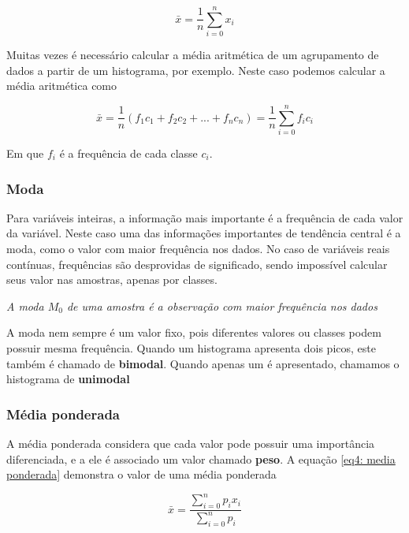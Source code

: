 \begin{equation}\label{eq3:media aritmetica}
\bar{x} = \frac{1}{n}\sum_{i = 0}^{n} x_i
\end{equation}

Muitas vezes é necessário calcular a média aritmética de um agrupamento de dados a partir de um histograma, por exemplo. Neste caso podemos calcular a média aritmética como 

\begin{equation}\label{eq3:media aritmetica}
\bar{x} = \frac{1}{n}(f_{1}c_{1} + f_{2}c_{2} + ...+ f_{n}c_{n} ) = \frac{1}{n}\sum_{i = 0}^{n} f_{i}c_{i}
\end{equation}

Em que $f_{i}$ é a frequência de cada classe $c_{i}$.

\subsubsection{Moda}

Para variáveis inteiras, a informação mais importante é a frequência de cada valor da variável. Neste caso uma das informações importantes de tendência central é a moda, como o valor com maior frequência nos dados. No caso de variáveis reais contínuas, frequências são desprovidas de significado, sendo impossível calcular seus valor nas amostras, apenas por classes.

\begin{definition}[Moda]
\textit{A moda $M_{0}$ de uma amostra é a observação com maior frequência nos dados} 
\end{definition}

A moda nem sempre é um valor fixo, pois diferentes valores ou classes podem possuir mesma frequência. Quando um histograma apresenta dois picos, este também é chamado de \textbf{bimodal}. Quando apenas um é apresentado, chamamos o histograma de \textbf{unimodal}

\subsubsection{Média ponderada}

A média ponderada considera que cada valor pode possuir uma importância diferenciada, e a ele é associado um valor chamado \textbf{peso}. A equação \eqref{eq4: media ponderada} demonstra o valor de uma média ponderada

\begin{equation}\label{eq4: media ponderada}
\bar{x} =  \frac{\sum_{i = 0}^{n} p_{i} x_{i}} {\sum_{i = 0}^{n} p_{i}}
\end{equation}

